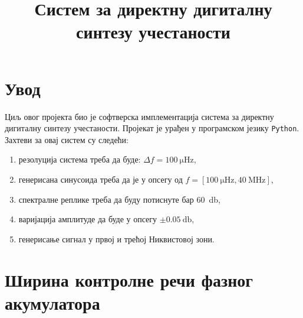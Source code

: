 \documentclass[conference]{IEEEJERM}
\begin{document}
%
\title{Систем за директну дигиталну синтезу учестаности}


\author{
}

\maketitle



\IEEEpeerreviewmaketitle



\section{Увод}

Циљ овог пројекта био је софтверска имплементација система за директну дигиталну синтезу учестаности.
Пројекат је урађен у програмском језику \texttt{Python}.
Захтеви за овај систем су следећи:

\begin{enumerate}
	\item резолуција система треба да буде: $\Delta f = \SI{100}{\micro \hertz}$,
	\item генерисана синусоида треба да је у опсегу од $f = \left[ \SI{100}{\micro \hertz}, \SI{40}{\mega \hertz} \right]$,
	\item спектралне реплике треба да буду потиснуте бар \SI{60}{\decibel},
	\item варијација амплитуде да буде у опсегу $\pm \SI{0.05}{\decibel}$,
	\item генерисање сигнал у првој и трећој Никвистовој зони.
\end{enumerate}


\section{Ширина контролне речи фазног акумулатора}
\end{document}
